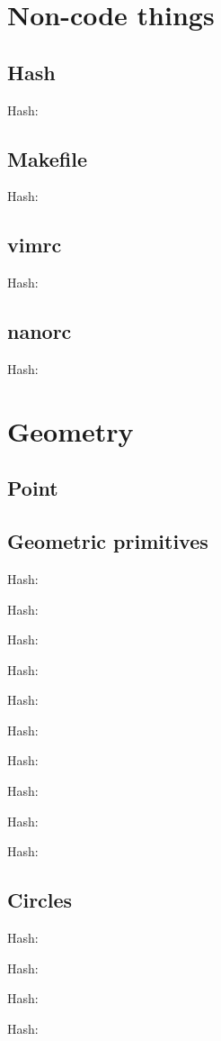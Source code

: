 \documentclass[10pt]{article}
\newcommand{\inputfile}[2]{
    Hash: \texttt{}
    
}
\begin{document}
\begin{multicols*}{3}
    \tableofcontents


    \section{Non-code things}
    \subsection{Hash}
        \inputfile{hash.sh}{txt}
    \subsection{Makefile}
        \inputfile{Makefile}{txt}
    \subsection{vimrc}
        \inputfile{vimrc}{txt}
    \subsection{nanorc}
        \inputfile{nanorc}{txt}

    \section{Geometry}
        \subsection{Point}

        \subsection{Geometric primitives}
            \inputfile{../kactl/geometry/Point.h}{cpp}
            \inputfile{../kactl/geometry/lineDistance.h}{cpp}
            \inputfile{../kactl/geometry/SegmentDistance.h}{cpp}
            \inputfile{../kactl/geometry/SegmentIntersection.h}{cpp}
            \inputfile{../kactl/geometry/SegmentIntersectionQ.h}{cpp}
            \inputfile{../kactl/geometry/lineIntersection.h}{cpp}
            \inputfile{../kactl/geometry/sideOf.h}{cpp}
            \inputfile{../kactl/geometry/onSegment.h}{cpp}
            \inputfile{../kactl/geometry/linearTransformation.h}{cpp}
            \inputfile{../kactl/geometry/Angle.h}{cpp}

        \subsection{Circles}   
            \inputfile{../kactl/geometry/CircleIntersection.h}{cpp}
            \inputfile{../kactl/geometry/circleTangents.h}{cpp}
            \inputfile{../kactl/geometry/circumcircle.h}{cpp}
            \inputfile{../kactl/geometry/MinimumEnclosingCircle.h}{cpp}


\end{multicols*}
\end{document}
